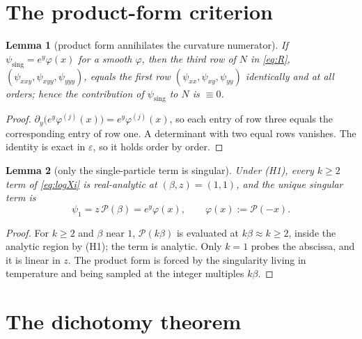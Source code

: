 \documentclass[a4paper,11pt]{article}
\theoremstyle{plain}
\newtheorem{lemma}{Lemma}
\theoremstyle{definition}
\theoremstyle{remark}
\newcommand{\eps}{\varepsilon}
\begin{document}
\section{The product-form criterion}\label{sec:lemmas}

\begin{lemma}[product form annihilates the curvature numerator]\label{lem:C1}
If $\psi_{\mathrm{sing}}=e^{y}\varphi(x)$ for a smooth $\varphi$, then the third row of $N$
in \eqref{eq:R}, $(\psi_{xxy},\psi_{xyy},\psi_{yyy})$, equals the first row
$(\psi_{xx},\psi_{xy},\psi_{yy})$ identically and at all orders; hence the contribution of
$\psi_{\mathrm{sing}}$ to $N$ is $\equiv0$.
\end{lemma}
\begin{proof}
$\partial_y\!\big(e^{y}\varphi^{(j)}(x)\big)=e^{y}\varphi^{(j)}(x)$, so each entry of row three
equals the corresponding entry of row one. A determinant with two equal rows vanishes. The
identity is exact in $\eps$, so it holds order by order. %
\end{proof}

\begin{lemma}[only the single-particle term is singular]\label{lem:k1}
Under \textnormal{(H1)}, every $k\ge2$ term of \eqref{eq:logXi} is real-analytic at
$(\beta,z)=(1,1)$, and the unique singular term is
\[
   \psi_1=z\,\mathcal P(\beta)=e^{y}\varphi(x),\qquad \varphi(x):=\mathcal P(-x).
\]
\end{lemma}
\begin{proof}
For $k\ge2$ and $\beta$ near $1$, $\mathcal P(k\beta)$ is evaluated at $k\beta\approx k\ge2$,
inside the analytic region by (H1); the term is analytic. Only $k=1$ probes the abscissa,
and it is linear in $z$. The product form is forced by the singularity living in temperature
and being sampled at the integer multiples $k\beta$. %
\end{proof}

\section{The dichotomy theorem}\label{sec:thm}
\end{document}
